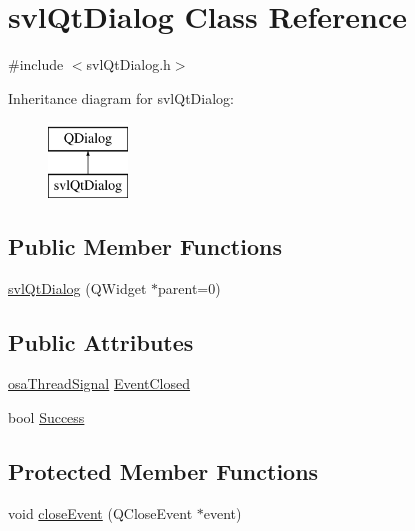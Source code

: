 \hypertarget{classsvl_qt_dialog}{\section{svl\-Qt\-Dialog Class Reference}
\label{classsvl_qt_dialog}
}


{\ttfamily \#include $<$svl\-Qt\-Dialog.\-h$>$}

Inheritance diagram for svl\-Qt\-Dialog\-:\begin{figure}[H]
\begin{center}
\leavevmode
\includegraphics[height=2.000000cm]{d2/d95/classsvl_qt_dialog}
\end{center}
\end{figure}
\subsection*{Public Member Functions}
\begin{DoxyCompactItemize}
\item 
\hyperlink{classsvl_qt_dialog_a0e310dd8e0ae7ad927c2159e80ee79eb}{svl\-Qt\-Dialog} (Q\-Widget $\ast$parent=0)
\end{DoxyCompactItemize}
\subsection*{Public Attributes}
\begin{DoxyCompactItemize}
\item 
\hyperlink{classosa_thread_signal}{osa\-Thread\-Signal} \hyperlink{classsvl_qt_dialog_aeaa078633b0ba390bb5a4a9f7075d08d}{Event\-Closed}
\item 
bool \hyperlink{classsvl_qt_dialog_abb071021d600d1ddd5c4d331df8cb5b0}{Success}
\end{DoxyCompactItemize}
\subsection*{Protected Member Functions}
\begin{DoxyCompactItemize}
\item 
void \hyperlink{classsvl_qt_dialog_aca4668951e3c3237e2dc86ed4b22456f}{close\-Event} (Q\-Close\-Event $\ast$event)
\end{DoxyCompactItemize}


